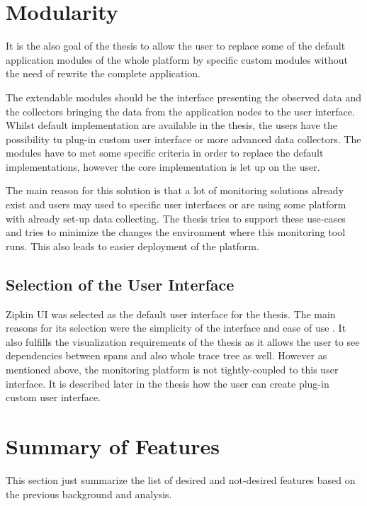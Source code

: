 \section{Modularity}
It is the also goal of the thesis to allow the user to replace some of the default application modules of the whole platform by specific custom modules without the need of rewrite the complete application.

The extendable modules should be the interface presenting the observed data and the collectors bringing the data from the application nodes to the user interface. Whilst default implementation are available in the thesis, the users have the possibility tu plug-in custom user interface or more advanced data collectors. The modules have to met some specific criteria in order to replace the default implementations, however the core implementation is let up on the user. 

The main reason for this solution is that a lot of monitoring solutions already exist and users may used to specific user interfaces or are using some platform with already set-up data collecting. The thesis tries to support these use-cases and tries to minimize the changes the environment where this monitoring tool runs. This also leads to easier deployment of the platform. 

\subsection{Selection of the User Interface}
Zipkin UI was selected as the default user interface for the thesis. The main reasons for its selection were the simplicity of the interface and ease of use . It also fulfills the visualization requirements of the thesis as it allows the user to see dependencies between spans and also whole trace tree as well. However as mentioned above, the monitoring platform is not tightly-coupled to this user interface.  It is described later in the thesis how the user can create plug-in custom user interface.

\section{Summary of Features}
This section just summarize the list of desired and not-desired features based on the previous background and analysis.

